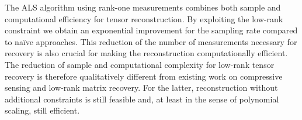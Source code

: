 The ALS algorithm using rank-one measurements combines both sample and computational efficiency for tensor reconstruction.
By exploiting the low-rank constraint we obtain an exponential improvement for the sampling rate compared to na\"ive approaches.
This reduction of the number of measurements necessary for recovery is also crucial for making the reconstruction computationally efficient.
The reduction of sample and computational complexity for low-rank tensor recovery is therefore qualitatively different from existing work on compressive sensing and low-rank matrix recovery.
For the latter, reconstruction without additional constraints is still feasible and, at least in the sense of polynomial scaling, still efficient.
